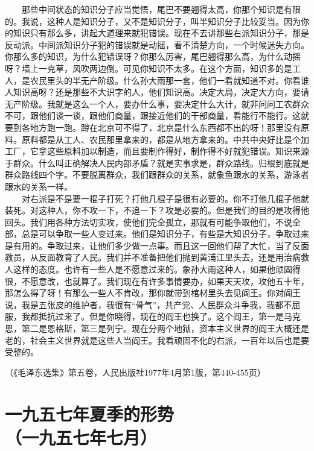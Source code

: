 \documentclass[cn,11pt,chinese]{elegantbook}
\def\myformat#1{\hfil\hfil #1}
\begin{document}
　　那些中间状态的知识分子应当觉悟，尾巴不要翘得太高，你那个知识是有限的。我说，这种人是知识分子，又不是知识分子，叫半知识分子比较妥当。因为你的知识只有那么多，讲起大道理来就犯错误。现在不去讲那些右派知识分子，那是反动派。中间派知识分子犯的错误就是动摇，看不清楚方向，一个时候迷失方向。你那么多的知识，为什么犯错误呀？你那么厉害，尾巴翘得那么高，为什么动摇呀？墙上一克草，风吹两边倒。可见你知识不太多。在这个方面，知识多的是工人，是农民里头的半无产阶级。什么孙大雨那一套，他们一看就知道不对。你看谁人知识高呀？还是那些不大识字的人，他们知识高。决定大局，决定大方向，要请无产阶级。我就是这么一个人，要办什么事，要决定什么大计，就非问问工农群众不可，跟他们谈一谈，跟他们商量，跟接近他们的干部商量，看能行不能行。这就要到各地方跑一跑。蹲在北京可不得了，北京是什么东西都不出的呀！那里没有原料。原料都是从工人、农民那里拿来的，都是从地方拿来的。中共中央好比是个加工厂，它拿这些原料加以制造，而且要制作得好，制作得不好就犯错误。知识来源于群众。什么叫正确解决人民内部矛盾？就是实事求是，群众路线。归根到底就是群众路线四个字。不要脱离群众，我们跟群众的关系，就象鱼跟水的关系，游泳者跟水的关系一样。\\
　　对右派是不是要一棍子打死？打他几棍子是很有必要的。你不打他几棍子他就装死。对这种人，你不攻一下，不追一下？攻是必要的。但是我们的目的是攻得他回头。我们用各种方法切实攻，使他们完全孤立，那就有可能争取他们，不说全部，总是可以争取一些人变过来。他们是知识分子，有些是大知识分子，争取过来是有用的。争取过来，让他们多少做一点事。而且这一回他们帮了大忙，当了反面教员，从反面教育了人民。我们并不准备把他们抛到黄浦江里头去，还是用治病救人这样的态度。也许有一些人是不愿意过来的。象孙大雨这种人，如果他顽固得很，不愿意改，也就算了。我们现在有许多事情要办，如果天天攻，攻他五十年，那怎么得了呀！有那么一些人不肯改，那你就带到棺材里头去见阎王。你对阎王说，我是五张皮的维护者，我很有“骨气”，共产党、人民群众斗争我，我都不屈服，我都抵抗过来了。但是你晓得，现在的阎王也换了。这个阎王，第一是马克思，第二是恩格斯，第三是列宁。现在分两个地狱，资本主义世界的阎王大概还是老的，社会主义世界就是这些人当阎王。我看顽固不化的右派，一百年以后也是要受整的。\\
\begin{flushright}（《毛泽东选集》第五卷，人民出版社1977年4月第1版，第440-455页）\end{flushright}
\newpage\section*{\myformat{一九五七年夏季的形势}\\\myformat{（一九五七年七月）}}
\end{document}
